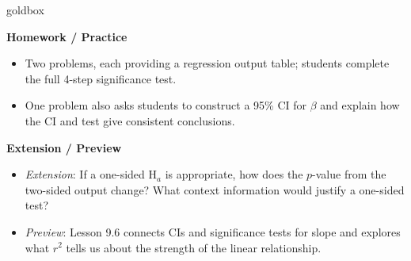\documentclass[10pt]{article}
\begin{document}
\begin{skillbox}{goldbox}
\begin{minipage}[t]{0.48\linewidth}
    \textbf{Homework / Practice}
    \begin{itemize}
        \item Two problems, each providing a regression output table; students complete
              the full 4-step significance test.
        \item One problem also asks students to construct a 95\% CI for $\beta$ and
              explain how the CI and test give consistent conclusions.
    \end{itemize}
\end{minipage}
\hfill
\begin{minipage}[t]{0.48\linewidth}
    \textbf{Extension / Preview}
    \begin{itemize}
        \item \textit{Extension}: If a one-sided H$_a$ is appropriate, how does the
              $p$-value from the two-sided output change? What context information
              would justify a one-sided test?
        \item \textit{Preview}: Lesson 9.6 connects CIs and significance tests for
              slope and explores what $r^2$ tells us about the strength of the
              linear relationship.
    \end{itemize}
\end{minipage}
\end{skillbox}
\end{document}
